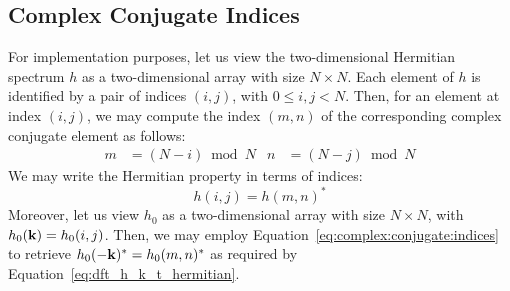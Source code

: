 \subsection{Complex Conjugate Indices}
%
For implementation purposes, let us view the two-dimensional Hermitian spectrum $h$
as a two-dimensional array with size $N \times N$.
Each element of $h$ is identified by a pair of indices $(i,j)$, with $0\leq i,j <N$. Then, for
an element at index $(i,j)$, we may compute the index $(m,n)$ of the corresponding complex
conjugate element as follows:
\begin{align}
\label{eq:complex:conjugate:indices}
m &= (N - i)\bmod N & n &= (N - j)\bmod N
\end{align}
We may write the Hermitian property in terms of indices:
\begin{equation*}
 h(i,j) = h(m,n)^*
\end{equation*}
%
Moreover, let us view $h_0$ as a two-dimensional array with size $N \times N$,
with $h_0(\mathbf{k}) = h_0(i,j)$. Then, we may employ Equation~\ref{eq:complex:conjugate:indices}
to retrieve $h_0(-\mathbf{k})^*=h_0(m,n)^*$ as required by
Equation~\ref{eq:dft_h_k_t_hermitian}.
%

%

%
